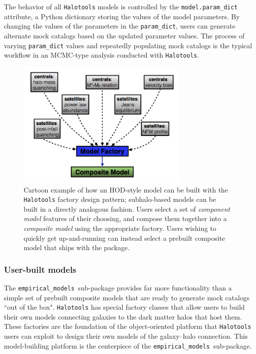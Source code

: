 \documentclass[twocolumn, tighten]{aastex6}
\newcommand{\emodels}{{\tt empirical\_models }}
\begin{document}
The behavior of all {\tt Halotools} models is controlled by the {\tt model.param\_dict} attribute, a Python dictionary storing the values of the model parameters. By changing the values of the parameters in the {\tt param\_dict}, users can generate alternate mock catalogs based on the updated parameter values. The process of varying {\tt param\_dict} values and repeatedly populating mock catalogs is the typical workflow in an MCMC-type analysis conducted with {\tt Halotools}.

\begin{figure}
\begin{center}
\includegraphics[width=8.3cm]{./FIGS/halotools_design.png}
\caption{
Cartoon example of how an HOD-style model can be built with the {\tt Halotools} factory design pattern; subhalo-based models can be built in a directly analogous fashion. Users select a set of {\em component model} features of their choosing, and compose them together into a {\em composite model} using the appropriate factory. Users wishing to quickly get up-and-running can instead select a prebuilt composite model that ships with the package.
}
\label{fig:modeling}
\end{center}
\end{figure}


\subsubsection{User-built models}
\label{subsubsection:userbuiltmodels}

The \emodels sub-package provides far more functionality than a simple set of prebuilt composite models that are ready to generate mock catalogs ``out of the box". {\tt Halotools} has special factory classes that allow users to build their own models connecting galaxies to the dark matter halos that host them. These factories are the foundation of the object-oriented platform that {\tt Halotools} users can exploit to design their own models of the galaxy--halo connection. This model-building platform is the centerpiece of the \emodels sub-package.
\end{document}
